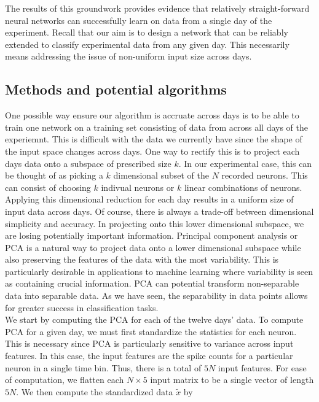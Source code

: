 \documentclass[12pt]{article}
\begin{document}
The results of this groundwork provides evidence that relatively straight-forward neural networks can successfully learn on data from a single day of the experiment.  Recall that our aim is to design a network that can be reliably extended to classify experimental data from any given day. This necessarily means addressing the issue of non-uniform input size across days.
\subsection{Methods and potential algorithms}
One possible way ensure our algorithm is accruate across days is to be able to train one network on a training set consisting of data from across all days of the experiemnt. This is difficult with the data we currently have since the shape of the input space changes across days. One way to rectify this is to project each days data onto a subspace of prescribed size $k$. In our experimental case, this can be thought of as picking a $k$ dimensional subset of the $N$ recorded neurons. This can consist of choosing $k$ indivual neurons or $k$ linear combinations of neurons. Applying this dimensional reduction for each day results in a uniform size of input data across days. Of course, there is always a trade-off between dimensional simplicity and accuracy. In projecting onto this lower dimensional subspace, we are losing potentially important information. Principal component analysis or PCA is a natural way to project data onto a lower dimensional subspace while also preserving the features of the data with the most variability. This is particularly desirable in applications to machine learning where variability is seen as containing crucial information. PCA can potential transform non-separable data into separable data. As we have seen, the separability in data points allows for greater success in classification tasks.\\
We start by computing the PCA for each of the twelve days' data. To compute PCA for a given day, we must first standardize the statistics for each neuron. This is necessary since PCA is particularly sensitive to variance across input features. In this case, the input features are the spike counts for a particular neuron in a single time bin. Thus, there is a total of $5N$ input features.  For ease of computation, we  flatten each $N\times5$ input matrix to be a single vector of length $5N$.  We then compute the standardized data $\tilde{x}$ by
\end{document}
